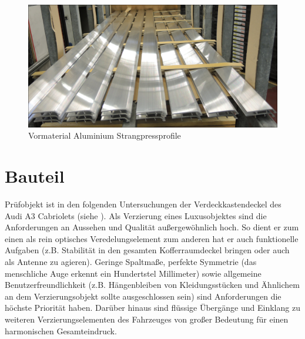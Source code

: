 \documentclass[12pt,a4paper,parskip]{scrartcl}
\begin{document}
\begin{figure}[H]
 \centering
 \includegraphics[width=.8\textwidth]{vormaterial}
 \caption{Vormaterial Aluminium Strangpressprofile}
 \label{fig:vormaterial}
 \end{figure}
  







  
\newpage
\section{Bauteil}
Prüfobjekt ist in den folgenden Untersuchungen der Verdeckkastendeckel  des Audi A3 Cabriolets (siehe ).
 Als Verzierung eines Luxusobjektes sind die Anforderungen an Aussehen und Qualität außergewöhnlich hoch. So dient er zum einen als rein optisches Veredelungselement zum anderen hat er auch funktionelle Aufgaben (z.B. Stabilität in den gesamten Kofferraumdeckel bringen oder auch als Antenne zu agieren). Geringe Spaltmaße,  perfekte Symmetrie (das menschliche Auge erkennt ein Hundertstel Millimeter) sowie allgemeine Benutzerfreundlichkeit (z.B. Hängenbleiben von Kleidungsstücken und Ähnlichem an dem Verzierungsobjekt sollte ausgeschlossen sein) sind Anforderungen die höchste Priorität haben.
 Darüber hinaus sind  flüssige Übergänge und Einklang   zu weiteren Verzierungselementen des Fahrzeuges von großer Bedeutung für einen harmonischen Gesamteindruck.
 
\end{document}
